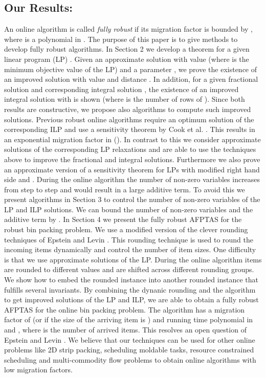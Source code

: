 \documentclass[a4paper,11pt]{article}
\begin{document}
\subsection{Our Results:}
An online algorithm is called \emph{fully robust} if its migration factor is bounded by
, where  is a polynomial in .
The purpose of this paper is to give methods to develop fully robust
algorithms. In Section 2 we develop a theorem for a given linear program (LP)
.
Given an approximate solution  
with value  (where  is the minimum objective value of the LP)
and a parameter , we prove the existence of an improved solution 
with value  and distance .
In addition, for a given fractional solution  and corresponding integral solution , the existence
of an improved integral solution  with  is shown
(where  is the number of rows of ). Since both results are constructive, we propose also algorithms
to compute such improved solutions.
Previous robust online algorithms require an optimum solution of the corresponding ILP and use a sensitivity theorem
by Cook et al. \cite{cook1986sensitivity}.
This results in an exponential migration factor in 
(\cite{epstein2006robust, epsteinu, skutella2010, sanders2009}).
In contrast to this we consider approximate solutions of the corresponding LP relaxations and are able
to use the techniques above to improve the fractional and integral solutions.
Furthermore we also prove an approximate version of a sensitivity theorem for LPs with modified right
hand side  and .
During the online algorithm the number of non-zero variables increases from step to step and would result
in a large additive term. To avoid this we present algorithms in Section 3 to control the number
of non-zero variables of the LP and ILP solutions. We can bound the number of non-zero variables and the
additive term by .
In Section 4 we present the fully robust AFPTAS for the robust bin packing problem. We use a modified
version of the clever rounding techniques of Epstein and Levin \cite{epstein2006robust}.
This rounding technique is used to round the incoming items dynamically and control the number of item sizes.
One difficulty is that we use approximate solutions of the LP.
During the online algorithm items are rounded to different values and are shifted across different 
rounding groups. We show how to embed the rounded instance into another rounded instance that fulfills
several invariants.
By combining the dynanic rounding and the algorithm to get improved solutions of the LP and ILP, we are able
to obtain a fully robust AFPTAS for the online bin packing problem.
The algorithm has a migration factor of 
 (or  if the size of the arriving item is ) and 
running time polynomial in  and , where  is the number of arrived items. 
This resolves an open question of Epstein and Levin \cite{epstein2006robust}. We believe that our techniques
can be used for other online problems like 2D strip packing, scheduling moldable tasks, resource constrained
scheduling and multi-commodity flow problems to obtain online algorithms with low migration factors.
\end{document}
